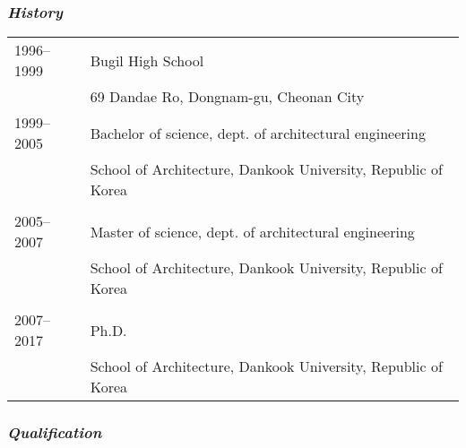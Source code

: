 \subsubsection*{\textit{History}}
\begin{tabular}{p{}l}
    1996--1999 & Bugil High School  \\
    & 69 Dandae Ro, Dongnam-gu, Cheonan City\\
    1999--2005 & Bachelor of science, dept. of architectural engineering\\
    & School of Architecture, Dankook University, Republic of Korea \\
    \\
    2005--2007 & Master of science, dept. of architectural engineering\\
    & School of Architecture, Dankook University, Republic of Korea  \\
    \\
    2007--2017 & Ph.D. \\
    & School of Architecture, Dankook University, Republic of Korea  \\
\end{tabular}

\subsubsection*{\textit{Qualification}}

